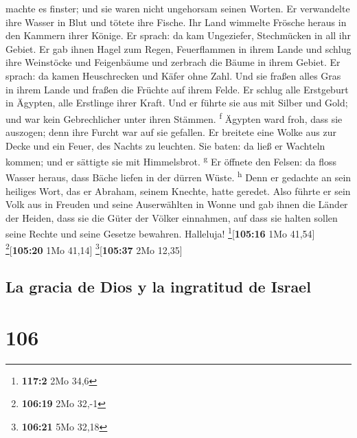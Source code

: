 machte es finster; und sie waren nicht ungehorsam seinen Worten.
 Er verwandelte ihre Wasser in Blut und tötete ihre
Fische.  Ihr Land wimmelte Frösche heraus in den Kammern
ihrer Könige.  Er sprach: da kam Ungeziefer, Stechmücken
in all ihr Gebiet.  Er gab ihnen Hagel zum Regen,
Feuerflammen in ihrem Lande  und schlug ihre Weinstöcke
und Feigenbäume und zerbrach die Bäume in ihrem Gebiet. 
Er sprach: da kamen Heuschrecken und Käfer ohne Zahl. 
Und sie fraßen alles Gras in ihrem Lande und fraßen die Früchte auf
ihrem Felde.  Er schlug alle Erstgeburt in Ägypten, alle
Erstlinge ihrer Kraft.  Und er führte sie aus mit Silber
und Gold; und war kein Gebrechlicher unter ihren Stämmen.
\textsuperscript{f}  Ägypten ward froh, dass sie
auszogen; denn ihre Furcht war auf sie gefallen.  Er
breitete eine Wolke aus zur Decke und ein Feuer, des Nachts zu leuchten.
 Sie baten: da ließ er Wachteln kommen; und er sättigte
sie mit Himmelsbrot. \textsuperscript{g}  Er öffnete den
Felsen: da floss Wasser heraus, dass Bäche liefen in der dürren Wüste.
\textsuperscript{h}  Denn er gedachte an sein heiliges
Wort, das er Abraham, seinem Knechte, hatte geredet. 
Also führte er sein Volk aus in Freuden und seine Auserwählten in Wonne
 und gab ihnen die Länder der Heiden, dass sie die Güter
der Völker einnahmen,  auf dass sie halten sollen seine
Rechte und seine Gesetze bewahren. Halleluja!
\footnote{\textbf{117:2} 2Mo 34,6}{[}\textbf{105:16} 1Mo 41,54{]}
\footnote{\textbf{106:19} 2Mo 32,-1}{[}\textbf{105:20} 1Mo 41,14{]}
\footnote{\textbf{106:21} 5Mo 32,18}{[}\textbf{105:37} 2Mo 12,35{]}

\hypertarget{la-gracia-de-dios-y-la-ingratitud-de-israel}{%
\subsection{La gracia de Dios y la ingratitud de
Israel}\label{la-gracia-de-dios-y-la-ingratitud-de-israel}}

\hypertarget{section-105}{%
\section{106}\label{section-105}}

